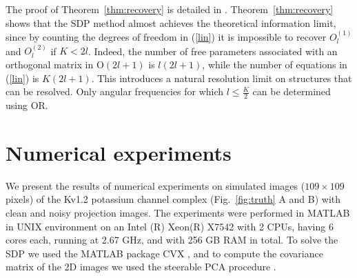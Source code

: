 The proof of Theorem~\ref{thm:recovery} is detailed in \cite{zhang2015}. Theorem~\ref{thm:recovery} shows that the SDP method almost achieves the theoretical information limit, since by counting the degrees of freedom in (\ref{lin}) it is impossible to recover $O_l^{(1)}$ and $O_l^{(2)}$ if $K< 2l$. Indeed, the number of free parameters associated with an orthogonal matrix in
$\text{O}(2l+1)$ is $l(2l+1)$, while the number of equations in (\ref{lin}) is $K(2l+1)$. This introduces a natural resolution limit on structures that can be resolved. Only angular frequencies for which $l \leq \frac{K}{2}$ can be determined using OR.

\section{Numerical experiments}
We present the results of numerical experiments on simulated images ($109\times 109$ pixels) of the Kv1.2 potassium
channel complex (Fig.~\ref{fig:truth} A and B) with clean and noisy
projection images. The experiments were performed in MATLAB in UNIX environment on an
Intel (R) Xeon(R) X7542 with 2 CPUs, having 6 cores each, running at 2.67 GHz, and with
256 GB RAM in total. To solve the SDP we used the MATLAB package CVX \cite{cvx}, and to compute the covariance matrix of the 2D images we used the steerable PCA procedure \cite{Zhao1}.


